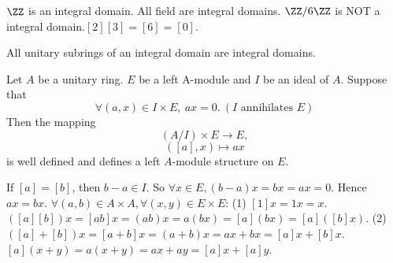 \begin{exampleenv}
    \quad \newline
    $\ZZ$ is an integral domain.
    \newline
     All field are integral domains.
     \newline
      $\ZZ/6\ZZ$ is NOT a integral domain.$[2][3]=[6]=[0].$
\end{exampleenv}
\begin{propositionenv}
    All unitary subrings of an integral domain are integral domains.
\end{propositionenv}
\begin{propositionenv}
    Let $A$ be a unitary ring. $E$ be a left A-module and $I$ be an ideal of $A$. Suppose that 
    $$\forall (a,x)\in I\times E,\ ax=0.\ (I\text{ annihilates }E)$$
    Then the mapping
    $$\left(A/I\right)\times E\longrightarrow E,$$
    $$\left([a],x\right)\longmapsto ax$$
    is well defined and defines a left $A$-module structure on $E$.
\end{propositionenv}
\begin{proofenv}
    If $[a]=[b]$, then $b-a\in I$. So $\forall x\in E, (b-a)x=bx=ax=0$. Hence $ax=bx$. $\forall (a,b)\in A\times A,\forall (x,y)\in E\times E$:
    \newline
    (1) $[1]x=1x=x.$ $\left([a][b]\right)x=[ab]x=(ab)x=a(bx)=[a](bx)=[a]([b]x)$.
    \newline
    (2) $\left([a]+[b]\right)x=[a+b]x=(a+b)x=ax+bx=[a]x+[b]x.$ $[a](x+y)=a(x+y)=ax+ay=[a]x+[a]y$.
\end{proofenv}



